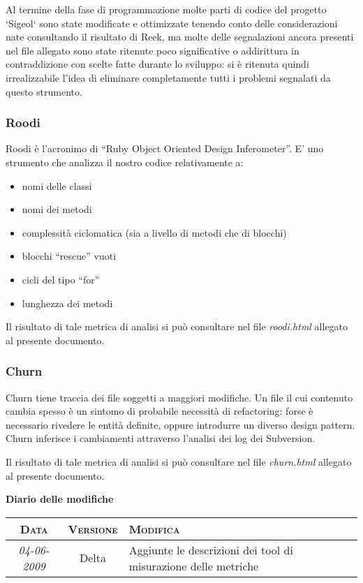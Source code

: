 \documentclass[11pt,a4paper]{article}
\newcommand{\modifiche} 
{
\newpage
\begin{center}
\textbf{Diario delle modifiche} \\
\bigskip
\begin{tabular}{|c|c|p{0.61\textwidth}|}
\hline
\textsc{Data} & \textsc{Versione} & \textsc{Modifica} \\
\hline
\hline
\textit{04-06-2009} & Delta & Aggiunte le descrizioni dei tool di misurazione delle metriche  \\
\hline
\end{tabular}
\end{center}
}
\begin{document}
Al termine della fase di programmazione molte parti di codice del progetto `Sigeol` sono state modificate e ottimizzate tenendo conto delle considerazioni nate consultando il risultato di Reek, ma molte delle segnalazioni ancora presenti nel file allegato sono state ritenute poco significative o addirittura in contraddizione con scelte fatte durante lo sviluppo: si è ritenuta quindi irrealizzabile l'idea di eliminare completamente tutti i problemi segnalati da questo strumento.
\subsubsection{Roodi}
Roodi è l’acronimo di “Ruby Object Oriented Design Inferometer”. E’ uno strumento che analizza il nostro codice relativamente a:
\begin{itemize}
 \item nomi delle classi
 \item nomi dei metodi
 \item complessità ciclomatica (sia a livello di metodi che di blocchi)
 \item blocchi “rescue” vuoti
 \item cicli del tipo “for”
 \item lunghezza dei metodi
\end{itemize}
Il risultato di tale metrica di analisi si può consultare nel file \textit{roodi.html} allegato al presente documento.
\subsubsection{Churn}
Churn tiene traccia dei file soggetti a maggiori modifiche. Un file il cui contenuto cambia spesso è un sintomo di probabile necessità di refactoring: forse è necessario rivedere le entità definite, oppure introdurre un diverso design pattern.
Churn inferisce i cambiamenti attraverso l’analisi dei log dei Subversion.

Il risultato di tale metrica di analisi si può consultare nel file \textit{churn.html} allegato al presente documento.
\modifiche
\end{document}
